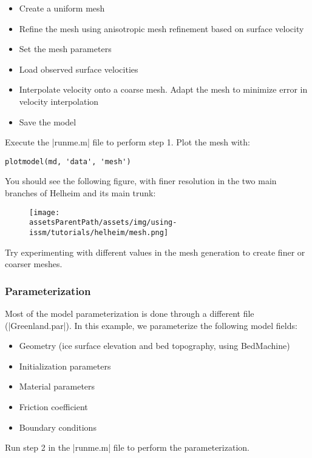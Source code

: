 \begin{itemize}
	\item Create a uniform mesh
	\item Refine the mesh using anisotropic mesh refinement based on surface velocity
	\item Set the mesh parameters
	\item Load observed surface velocities
	\item Interpolate velocity onto a coarse mesh. Adapt the mesh to minimize error in velocity interpolation
	\item Save the model
\end{itemize}

Execute the \lstinlinebg|runme.m| file to perform step 1. Plot the mesh with:

\begin{lstlisting}
plotmodel(md, 'data', 'mesh')
\end{lstlisting}

You should see the following figure, with finer resolution in the two main branches of Helheim and its main trunk:
\begin{figure}[h!]
	\begin{center}
	\texttt{[image: \\assetsParentPath/assets/img/using-issm/tutorials/helheim/mesh.png]}
	\end{center}
\end{figure}

Try experimenting with different values in the mesh generation to create finer or coarser meshes.

\subsubsection{Parameterization}
Most of the model parameterization is done through a different file (\lstinlinebg|Greenland.par|). In this example, we parameterize the following model fields:
\begin{itemize}
	\item Geometry (ice surface elevation and bed topography, using BedMachine)
	\item Initialization parameters
	\item Material parameters
	\item Friction coefficient
	\item Boundary conditions
\end{itemize}

Run step 2 in the \lstinlinebg|runme.m| file to perform the parameterization.

